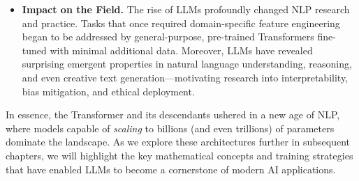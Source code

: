 \begin{itemize}
    \item \textbf{Impact on the Field.}
    The rise of LLMs profoundly changed NLP research and practice. Tasks that once required domain-specific feature engineering began to be addressed by general-purpose, pre-trained Transformers fine-tuned with minimal additional data. Moreover, LLMs have revealed surprising emergent properties in natural language understanding, reasoning, and even creative text generation—motivating research into interpretability, bias mitigation, and ethical deployment.

\end{itemize}

\noindent
In essence, the Transformer and its descendants ushered in a new age of NLP, where models capable of \emph{scaling} to billions (and even trillions) of parameters dominate the landscape. As we explore these architectures further in subsequent chapters, we will highlight the key mathematical concepts and training strategies that have enabled LLMs to become a cornerstone of modern AI applications.
